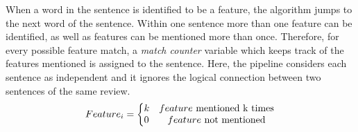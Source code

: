 When a word in the sentence is identified to be a feature, the algorithm jumps to the next word of the sentence. Within one sentence more than one feature can be identified, as well as features can be mentioned more than once. Therefore, for every possible feature match, a\textit{ match counter } variable which keeps track of the features mentioned is assigned to the sentence. Here, the pipeline considers each sentence as independent and it ignores the logical connection between two sentences of the same review.
\begin{equation}
  Feature_i=\left\{
    \begin{array}{@{} l c @{}}
      k & \text{$feature$ mentioned k times} \\
      0 & \text{$feature$ not mentioned}
    \end{array}\right.
  \label{eq4}
\end{equation}


